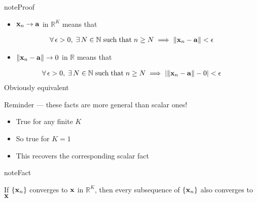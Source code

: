 \documentclass[letterpaper,10pt,english]{jupyterBook}
\begin{document}
\begin{sphinxadmonition}{note}{Proof}
\begin{itemize}
\item {} 
\sphinxAtStartPar
\({\bf x}_n \to {\bf a}\) in \(\mathbb{R}^K\) means that

\end{itemize}
\begin{equation*}
\begin{split}
\forall \, \epsilon > 0, 
\;
\exists \, N \in \mathbb{N}
\; \mathrm{such\;that}  \; 
n \geq N \implies \| {\bf x}_n - {\bf a} \| < \epsilon
\end{split}
\end{equation*}\begin{itemize}
\item {} 
\sphinxAtStartPar
\(\|{\bf x}_n - {\bf a}\| \to 0\) in \(\mathbb{R}\) means that

\end{itemize}
\begin{equation*}
\begin{split}
\forall\,  \epsilon > 0, 
\;
\exists \, N \in \mathbb{N}
\; \mathrm{such\;that}  \;
n \geq N \implies | \| {\bf x}_n - {\bf a} \| - 0 | < \epsilon
\end{split}
\end{equation*}
\sphinxAtStartPar
Obviously equivalent
\end{sphinxadmonition}

\sphinxAtStartPar
Reminder — these facts are more general than scalar ones!
\begin{itemize}
\item {} 
\sphinxAtStartPar
True for any finite \(K\)

\item {} 
\sphinxAtStartPar
So true for \(K = 1\)

\item {} 
\sphinxAtStartPar
This recovers the corresponding scalar fact

\end{itemize}

\sphinxAtStartPar
{}

\begin{sphinxadmonition}{note}{Fact}

\sphinxAtStartPar
If \(\{ {\bf x}_n \}\) converges to \({\bf x}\) in \(\mathbb{R}^K\), then every
subsequence of \(\{{\bf x}_n\}\) also converges to \({\bf x}\)
\end{sphinxadmonition}
\end{document}
